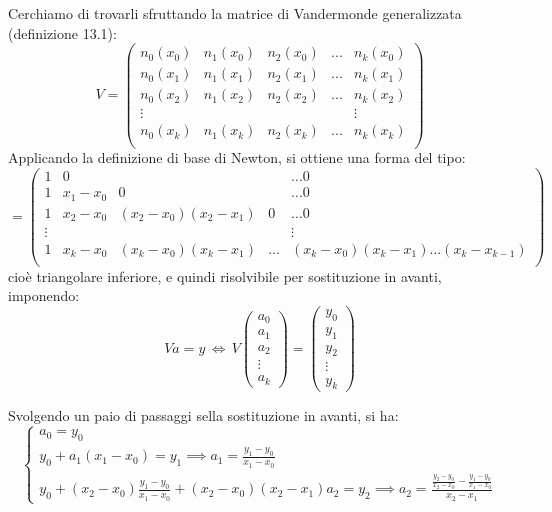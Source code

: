 \documentclass[a4paper,11pt]{article}
\begin{document}
Cerchiamo di trovarli sfruttando la matrice di Vandermonde generalizzata (definizione 13.1):
$$
V = 
\begin{pmatrix}
	n_0(x_0) & n_1(x_0) & n_2(x_0) & ... & n_k(x_0) \\
	n_0(x_1) & n_1(x_1) & n_2(x_1) & ... & n_k(x_1) \\
	n_0(x_2) & n_1(x_2) & n_2(x_2) & ... & n_k(x_2) \\
	\vdots & & & & \vdots \\
	n_0(x_k) & n_1(x_k) & n_2(x_k) & ... & n_k(x_k) \\
\end{pmatrix}
$$
Applicando la definizione di base di Newton, si ottiene una forma del tipo:
$$
= \begin{pmatrix}
	1 & 0 & &  & ...0 \\ 
	1 & x_1 - x_0 & 0 & & ...0 \\ 
	1 & x_2 - x_0 & (x_2 - x_0)(x_2 - x_1) & 0 & ...0 \\ 
	\vdots & & & & \vdots \\
	1 & x_k - x_0 & (x_k - x_0)(x_k - x_1) & ... & (x_k - x_0) (x_k - x_1) ... (x_k - x_{k - 1}) \\ 
\end{pmatrix}
$$
cioè triangolare inferiore, e quindi risolvibile per sostituzione in avanti, imponendo:
$$
Va = y \, \Leftrightarrow \,
V \begin{pmatrix}
	a_0 \\ a_1 \\ a_2 \\ \vdots \\ a_k
\end{pmatrix}
=
\begin{pmatrix}
	y_0 \\ y_1 \\ y_2 \\ \vdots \\ y_k
\end{pmatrix}
$$

Svolgendo un paio di passaggi sella sostituzione in avanti, si ha:
\[
	\begin{cases}
		a_0 = y_0 \\
		y_0 + a_1 (x_1 - x_0) = y_1 \implies a_1 = \frac{y_1 - y_0}{x_1 - x_0} \\
		y_0 + (x_2 - x_0) \frac{y_1 - y_0}{x_1 - x_0} + (x_2 - x_0)(x_2 - x_1) a_2 = y_2 \implies a_2 = \frac{ \frac{y_2 - y_0}{x_2 - x_0} - \frac{y_1 - y_0}{x_1 - x_0} }{x_2 - x_1}
	\end{cases}
\]
\end{document}
